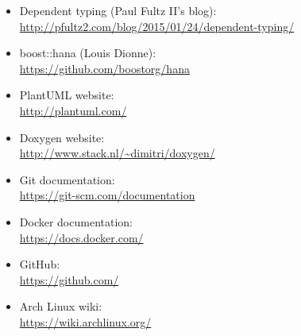 \documentclass[11pt]{report}
\newcommand{\+}{\discretionary{\mbox{\scriptsize$\hookleftarrow$}}{}{}}
\begin{document}
\begin{itemize}
        \item Dependent typing (Paul Fultz II's blog): \\ \url{http://pfultz2.com/blog/2015/01/24/dependent-typing/}
        \item boost::hana (Louis Dionne): \\ \url{https://github.com/boostorg/hana}

        \item PlantUML website: \\ \url{http://plantuml.com/}
        \item Doxygen website: \\ \url{http://www.stack.nl/~dimitri/doxygen/}
    
        \item Git documentation: \\ \url{https://git-scm.com/documentation}
        \item Docker documentation: \\ \url{https://docs.docker.com/}
        \item GitHub: \\ \url{https://github.com/}
        \item Arch Linux wiki: \\ \url{https://wiki.archlinux.org/}
    \end{itemize}
\end{document}
